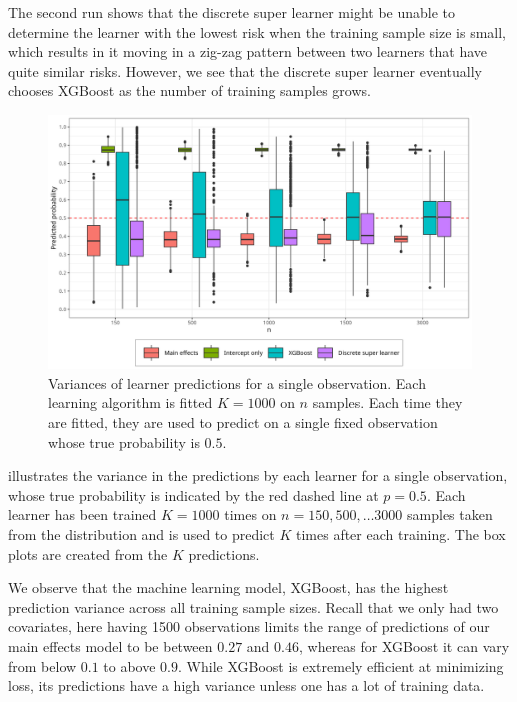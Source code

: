 \documentclass[./main.tex]{subfiles}
\begin{document}
The second run shows that the discrete super learner might be unable to determine the learner with the lowest risk when the training sample size is small, which results in it moving in a zig-zag pattern between two learners that have quite similar risks. However, we see that the discrete super learner eventually chooses XGBoost as the number of training samples grows.  

\begin{figure}[H]
    \centering
    \includegraphics[width=\textwidth]{figures/learner_vars.png}
    \caption{Variances of learner predictions for a single observation. Each learning algorithm is fitted $ K = 1000 $ on $n$ samples. Each time they are fitted, they are used to predict on a single fixed observation whose true probability is $ 0.5 $.}
    \label{fig:pred_probs_boxplot}
\end{figure}
 illustrates the variance in the predictions by each learner for a single observation, whose true probability is indicated by the red dashed line at $ p = 0.5 $. Each learner has been trained $ K = 1000 $ times on $ n = 150, 500, \dots 3000 $ samples taken from the distribution and is used to predict $ K $ times after each training. The box plots are created from the $ K $ predictions. 

We observe that the machine learning model, XGBoost, has the highest prediction variance across all training sample sizes. Recall that we only had two covariates, here having 1500 observations limits the range of predictions of our main effects model to be between $ 0.27 $ and $ 0.46 $, whereas for XGBoost it can vary from below $ 0.1 $ to above $ 0.9 $. While XGBoost is extremely efficient at minimizing loss, its predictions have a high variance unless one has a lot of training data. 
\end{document}
